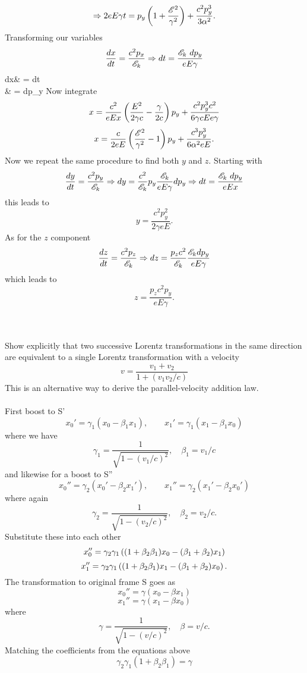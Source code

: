 \documentclass[10pt,letterpaper]{article}
\begin{document}
\[
	\Rightarrow 2eE\gamma t= p_y\plr{1+\frac{\mathscr E^2}{\gamma^2}}+
	\frac{c^2p_y^3}{3\alpha ^2}.
\]
Transforming our variables
\[
	\diff[x]{t} = \frac{c^2p_x}{\mathscr E_k} \Rightarrow dt =\frac{\mathscr E_k\ dp_y}{eE\gamma}
\]
\ba
	\Rightarrow dx& = dt\\
	& = dp_y
\ea
Now integrate
\[
	x = \frac{c^2}{eEx}\plr{\frac{E^2}{2\gamma c}-\frac{\gamma}{2c}}p_y+
	\frac{c^2p_y^3 c^2}{6\gamma c Ee\gamma}
\]
\[
	x = \frac{c}{2eE}\plr{\frac{\mathscr E^2}{\gamma^2}-1}p_y + \frac{c^3p_y^3}{6\alpha^2 eE}.
\]
Now we repeat the same procedure to find both $y$ and $z$. Starting with
\[
	\diff[y]{t} = \frac{c^2p_y}{\mathscr E_k}\Rightarrow dy = \frac{c^2}{\mathscr E_k}p_y\frac{\mathscr E_k}{eE\gamma}
	dp_y\Rightarrow dt = \frac{\mathscr E_k\ dp_y}{eEx}
\]
this leads to
\[
	y = \frac{c^2 p_y^2}{2\gamma eE}.
\]
As for the $z$ component
\[
	\diff[z]{t} = \frac{c^2 p_z}{\mathscr E_k} \Rightarrow dz = \frac{p_zc^2}{\mathscr E_k} \frac{\mathscr E_k dp_y}{eE\gamma}
\]
which leads to 
\[
	z = \frac{p_zc^2p_y}{eE\gamma}.
\]\\ \\
\item
Show explicitly that two successive Lorentz transformations in the same direction are equivalent to a single Lorentz 
transformation with a velocity 
\[
	v = \frac{v_1+v_2}{1+(v_1v_2/c)}
\]
This is an alternative way to derive the parallel-velocity addition law.
\\ \\
First boost to S'
\[
	x_0' = \gamma_1(x_0-\beta_1 x_1),\qquad x_1' = \gamma_1(x_1-\beta_1 x_0)
\]
where we have
\[
	\gamma_1 = \frac{1}{\sqrt{1-(v_1/c)^2}},\quad \beta_1 = v_1/c
\]
and likewise for a boost to S''
\[
	x_0'' = \gamma_2(x_0'-\beta_2x_1'),\qquad x_1'' = \gamma_2(x_1'-\beta_2x_0')
\]
where again
\[
	\gamma_2 = \frac{1}{\sqrt{1-(v_2/c)^2}},\quad \beta_2 = v_2/c.
\]
Substitute these into each other
\[
	x_0'' = \gamma_2\gamma_1\plr{ (1+\beta_2\beta_1)x_0-(\beta_1+\beta_2)x_1}
\]	
\[
	x_1'' = \gamma_2\gamma_1\plr{ (1+\beta_2\beta_1)x_1-(\beta_1+\beta_2)x_0}.
\]
The transformation to original frame S goes as
\[
	x_0'' = \gamma(x_0-\beta x_1)
\]
\[
	x_1'' = \gamma(x_1-\beta x_0)
\]
where
\[
	\gamma = \frac{1}{\sqrt{1-(v/c)^2}},\quad \beta = v/c.
\]	
Matching the coefficients from the equations above
\[
	\gamma_2\gamma_1 (1+\beta_2\beta_1) = \gamma
\]
\end{document}
